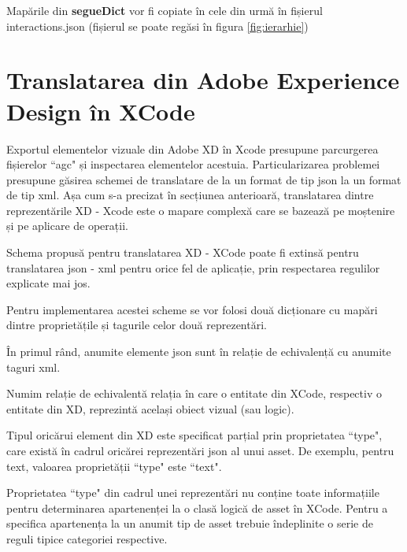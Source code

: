 Mapările din \textbf{segueDict} vor fi copiate în cele din urmă în fișierul interactions.json (fișierul se poate regăsi în figura \ref{fig:ierarhie})

\section{Translatarea din Adobe Experience Design în XCode}\label{xd2xcodev1}


Exportul elementelor vizuale din Adobe XD în Xcode presupune parcurgerea fișierelor ``agc" și inspectarea elementelor acestuia. Particularizarea problemei presupune găsirea schemei de translatare de la un format de tip json la un format de tip xml. Așa cum s-a precizat în secțiunea anterioară, translatarea dintre reprezentările XD - Xcode este o mapare complexă care se bazează pe moștenire și pe aplicare de operații. 

Schema propusă pentru translatarea XD - XCode poate fi extinsă pentru translatarea json - xml pentru orice fel de aplicație, prin respectarea regulilor explicate mai jos. 

Pentru implementarea acestei scheme se vor folosi două dicționare cu mapări dintre proprietățile și tagurile celor două reprezentări. 

În primul rând, anumite elemente json sunt în relație de echivalență cu anumite taguri xml. 
\\

\begin{mydef}\label{echivalent}
Numim relație de echivalentă relația în care o entitate din XCode, respectiv o entitate din XD, reprezintă același obiect vizual (sau logic).\\
\end{mydef}

\begin{myNote}\label{tip}
Tipul oricărui element din XD este specificat parțial prin proprietatea ``type", care există în cadrul oricărei reprezentări json al unui asset. De exemplu, pentru text, valoarea proprietății ``type" este ``text".\\
\end{myNote}

\begin{myNote}\label{echivalent}
Proprietatea ``type" din cadrul unei reprezentări nu conține toate informațiile pentru determinarea apartenenței la o clasă logică de asset în XCode. Pentru a specifica apartenența la un anumit tip de asset trebuie îndeplinite o serie de reguli tipice categoriei respective.\\
\end{myNote}

